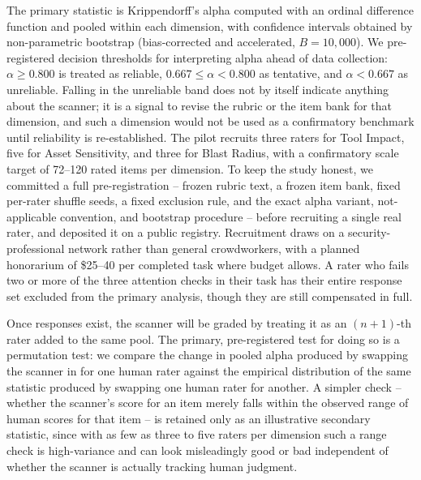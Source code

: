 \documentclass[sigconf]{acmart}
\begin{document}
The primary statistic is Krippendorff's alpha computed with an ordinal difference function and pooled within each dimension, with confidence intervals obtained by non-parametric bootstrap (bias-corrected and accelerated, $B=10{,}000$). We pre-registered decision thresholds for interpreting alpha ahead of data collection: $\alpha \geq 0.800$ is treated as reliable, $0.667 \leq \alpha < 0.800$ as tentative, and $\alpha < 0.667$ as unreliable. Falling in the unreliable band does not by itself indicate anything about the scanner; it is a signal to revise the rubric or the item bank for that dimension, and such a dimension would not be used as a confirmatory benchmark until reliability is re-established. The pilot recruits three raters for Tool Impact, five for Asset Sensitivity, and three for Blast Radius, with a confirmatory scale target of 72--120 rated items per dimension. To keep the study honest, we committed a full pre-registration -- frozen rubric text, a frozen item bank, fixed per-rater shuffle seeds, a fixed exclusion rule, and the exact alpha variant, not-applicable convention, and bootstrap procedure -- before recruiting a single real rater, and deposited it on a public registry. Recruitment draws on a security-professional network rather than general crowdworkers, with a planned honorarium of \$25--40 per completed task where budget allows. A rater who fails two or more of the three attention checks in their task has their entire response set excluded from the primary analysis, though they are still compensated in full.

Once responses exist, the scanner will be graded by treating it as an $(n{+}1)$-th rater added to the same pool. The primary, pre-registered test for doing so is a permutation test: we compare the change in pooled alpha produced by swapping the scanner in for one human rater against the empirical distribution of the same statistic produced by swapping one human rater for another. A simpler check -- whether the scanner's score for an item merely falls within the observed range of human scores for that item -- is retained only as an illustrative secondary statistic, since with as few as three to five raters per dimension such a range check is high-variance and can look misleadingly good or bad independent of whether the scanner is actually tracking human judgment.
\end{document}
